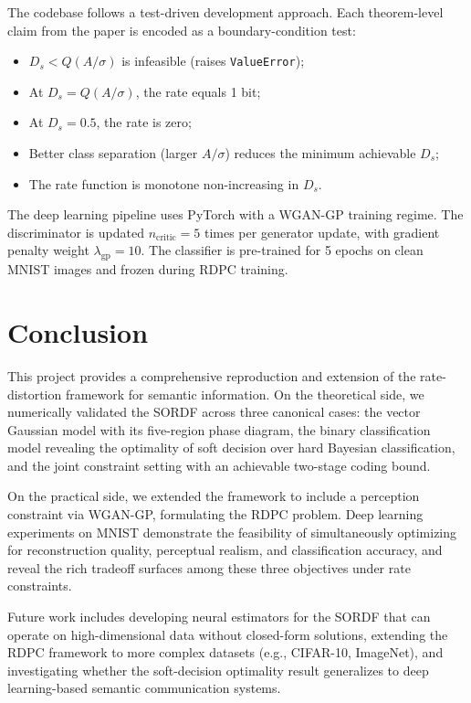 \documentclass[conference]{IEEEtran}
\begin{document}
The codebase follows a test-driven development approach. Each theorem-level claim from the paper is encoded as a boundary-condition test:
\begin{itemize}
    \item $D_s < Q(A/\sigma)$ is infeasible (raises \texttt{ValueError});
    \item At $D_s = Q(A/\sigma)$, the rate equals 1 bit;
    \item At $D_s = 0.5$, the rate is zero;
    \item Better class separation (larger $A/\sigma$) reduces the minimum achievable $D_s$;
    \item The rate function is monotone non-increasing in $D_s$.
\end{itemize}

The deep learning pipeline uses PyTorch with a WGAN-GP training regime. The discriminator is updated $n_{\text{critic}} = 5$ times per generator update, with gradient penalty weight $\lambda_{\text{gp}} = 10$. The classifier is pre-trained for 5 epochs on clean MNIST images and frozen during RDPC training.

\section{Conclusion}

This project provides a comprehensive reproduction and extension of the rate-distortion framework for semantic information. On the theoretical side, we numerically validated the SORDF across three canonical cases: the vector Gaussian model with its five-region phase diagram, the binary classification model revealing the optimality of soft decision over hard Bayesian classification, and the joint constraint setting with an achievable two-stage coding bound.

On the practical side, we extended the framework to include a perception constraint via WGAN-GP, formulating the RDPC problem. Deep learning experiments on MNIST demonstrate the feasibility of simultaneously optimizing for reconstruction quality, perceptual realism, and classification accuracy, and reveal the rich tradeoff surfaces among these three objectives under rate constraints.

Future work includes developing neural estimators for the SORDF that can operate on high-dimensional data without closed-form solutions, extending the RDPC framework to more complex datasets (e.g., CIFAR-10, ImageNet), and investigating whether the soft-decision optimality result generalizes to deep learning-based semantic communication systems.
\end{document}
